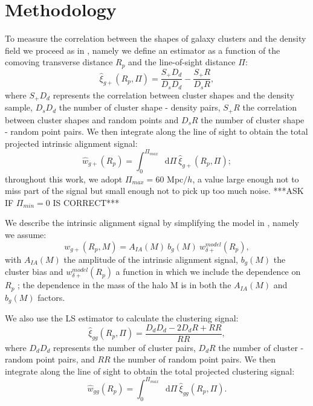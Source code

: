 \documentclass[a4paper,fleqn,usenatbib]{mnras}
\newcommand*\dif{\mathop{}\!\mathrm{d}}
\begin{document}
\section{Methodology}
To measure the correlation between the shapes of galaxy clusters and the density field we proceed as in \citet{vanUitertJoachimi2017}, namely we define an estimator as a function of the comoving transverse distance $R_p$ and the line-of-sight distance $\Pi$:
\begin{equation}
    \hat{\xi}_{g+}(R_p, \Pi) = \frac{S_+ D_d}{D_s D_d}-\frac{S_+ R}{D_s R},
	\label{eq:xigphat}
\end{equation}
where $S_+ D_d$ represents the correlation between cluster shapes and the density sample, $D_s D_d$ the number of cluster shape - density pairs, $S_+ R$ the correlation between cluster shapes and random points and $D_s R$ the number of cluster shape - random point pairs. We then integrate along the line of sight to obtain the total projected intrinsic alignment signal:
\begin{equation}
   \hat{w}_{g+} (R_p) = \int _0 ^{\Pi_{max}} \dif \Pi \ \hat{\xi}_{g+}(R_p, \Pi);
	\label{eq:wgphat}
\end{equation}
throughout this work, we adopt $\Pi_{max} = 60 $ Mpc$/h$, a value large enough not to miss part of the signal but small enough not to pick up too much noise. ***ASK IF $\Pi_{min} = 0$ IS CORRECT***

We describe the intrinsic alignment signal by simplifying the model in \citet{vanUitertJoachimi2017}, namely we assume:
\begin{equation}
    w_{g+} (R_p, M)=A_{IA} (M) \ b_g (M)\ w_{\delta +}^{model} (R_p), 
	\label{eq:wgp}
\end{equation}
with $A_{IA} (M)$ the amplitude of the intrinsic alignment signal, $b_g (M)$ the cluster bias and $w_{\delta +}^{model} (R_p)$ a function in which we include the dependence on $R_p$  \citep[equation 5]{vanUitertJoachimi2017}; the dependence in the mass of the halo M is in both the $A_{IA} (M)$ and $b_g (M)$ factors.

We also use the LS \citep{LandySzalay1993} estimator to calculate the clustering signal:
\begin{equation}
    \hat{\xi}_{gg}(R_p, \Pi) = \frac{D_dD_d -2D_dR + RR}{RR},
	\label{eq:xigghat}
\end{equation}
where $D_dD_d$ represents the number of cluster pairs, $D_dR$ the number of cluster - random point pairs, and $RR$ the number of random point pairs. We then integrate along the line of sight to obtain the total projected clustering signal:
\begin{equation}
   \hat{w}_{gg} (R_p) = \int _0 ^{\Pi_{max}} \dif \Pi \ \hat{\xi}_{gg}(R_p, \Pi).
	\label{eq:wgghat}
\end{equation}
\end{document}
